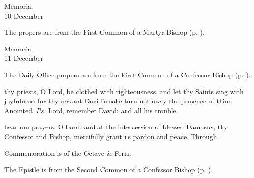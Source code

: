 


\begin{inhead}
    {Memorial\\
10 December}
\end{inhead}

\begin{rubric}
	The propers are from the First Common of a Martyr Bishop (p. \pageref{CommonMartyrBishopI}).
\end{rubric}


\begin{inhead}
    {Memorial\\
11 December}
\end{inhead}

\begin{rubric}
	The Daily Office propers are from the First Common of a Confessor Bishop (p. \pageref{CommonConfessorBishopI}).
\end{rubric}

\introit
{} thy priests, O Lord, be clothed with righteousness, and let thy Saints sing with joyfulness: for thy servant David's sake turn not away the presence of thine Anointed. \textit{Ps.} Lord, remember David: and all his trouble.

\collect
{} hear our prayers, O Lord: and at the intercession of blessed Damasus, thy Confessor and Bishop, mercifully grant us pardon and peace. Through.

\begin{rubric}
	Commemoration is of the Octave \& Feria.
\end{rubric}

\begin{rubric}
	The Epistle is from the Second Common of a Confessor Bishop (p. \pageref{CommonConfessorBishopII}).
\end{rubric}


